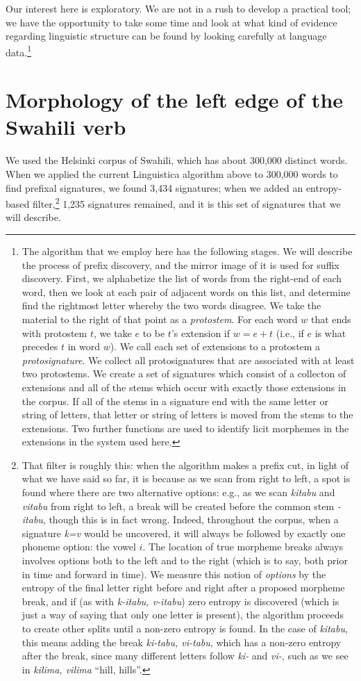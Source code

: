 \documentclass[output=paper,colorlinks,citecolor=brown]{langscibook}
\begin{document}
Our interest here is exploratory. We are not in a rush to develop a practical tool; we have the opportunity to take some time and look at what kind of evidence regarding linguistic structure can be found by looking carefully at language data.\footnote{The algorithm that we employ here has the following stages. We will describe the process of prefix discovery, and the mirror image of it is used for suffix discovery. First, we alphabetize the list of words from the right-end of each word, then we look at each pair of adjacent words on this list, and determine find the rightmost letter whereby the two words disagree. We take the material to the right of that point as a \textit{protostem}. For each word $w$ that ends with protostem $t$, we take $e$ to be $t$'s extension if $w=e+t$ (i.e., if $e$ is what precedes $t$ in word $w$). We call each set of extensions to a protostem a \textit{protosignature}. We collect all protosignatures that are associated with at least two protostems. We create a set of signatures which consist of a collecton of extensions and all of the stems which occur with exactly those extensions in the corpus. If all of the stems in a signature end with the same letter or string of letters, that letter or string of letters is moved from the stems to the extensions. Two further functions are used to identify licit morphemes in the extensions in the system used here.}


\section{Morphology of the left edge of the Swahili verb}

We used the Helsinki corpus of Swahili, which has about 300,000 distinct words. When we applied the current Linguistica algorithm above to 300,000 words to find prefixal signatures, we found 3,434 signatures; when we added an entropy-based filter,\footnote{That filter is roughly this: when the algorithm makes a prefix cut, in light of what we have said so far, it is because as we scan from right to left, a spot is found where there are two alternative options: e.g., as we scan \textit{kitabu} and \textit{vitabu} from right to left, a break will be created before {the common stem \textit{-itabu}, though this is in fact wrong. Indeed, throughout the corpus, when a signature \textit{k=v} would be uncovered, it will always be followed by exactly one phoneme option: the vowel $i$. The location of true morpheme breaks always involves options both to the left and to the right (which is to say, both prior in time and forward in time). We measure this notion of \textit{options} by the entropy of the final letter right before and right after a proposed morpheme break, and if (as with \textit{k-itabu, v-itabu}) zero entropy is discovered (which is just a way of saying that only one letter is present), the algorithm proceeds to create other splits until a non-zero entropy is found. In the case of \textit{kitabu}, this means adding the break \textit{ki-tabu, vi-tabu}, which has a non-zero entropy after the break, since many different letters follow \textit{ki-} and \textit{vi-}, such as we see in \textit{kilima, vilima} ``hill, hills''.}}  1,235 signatures remained, and it is this set of signatures that we will describe.  
\end{document}
